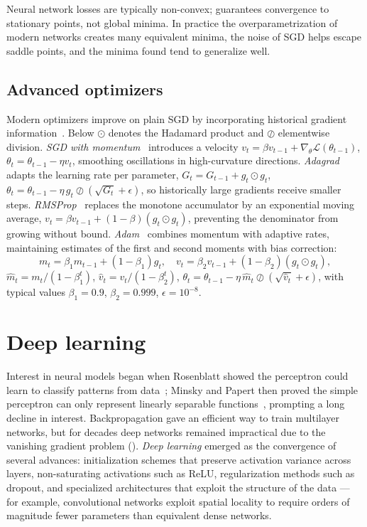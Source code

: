 Neural network losses are typically non-convex; 
guarantees convergence to stationary points, not global minima. In practice the
overparametrization of modern networks creates many equivalent minima, the noise
of SGD helps escape saddle points, and the minima found tend to generalize well.

\subsection{Advanced optimizers}
\label{sec:found:optimizers}

Modern optimizers improve on plain SGD by incorporating historical gradient
information~\citep{kingma2014adam,duchi2011adagrad}. Below $\odot$ denotes the
Hadamard product and $\oslash$ elementwise division. \emph{SGD with
momentum}~\citep{polyak1964methods} introduces a velocity
$v_t = \beta v_{t-1} + \nabla_\theta\mathcal{L}(\theta_{t-1})$,
$\theta_t = \theta_{t-1} - \eta v_t$, smoothing oscillations in high-curvature
directions. \emph{Adagrad}~\citep{duchi2011adagrad} adapts the learning rate per
parameter, $G_t = G_{t-1} + g_t \odot g_t$,
$\theta_t = \theta_{t-1} - \eta\, g_t \oslash (\sqrt{G_t} + \epsilon)$, so
historically large gradients receive smaller steps.
\emph{RMSProp}~\citep{hinton2012rmsprop} replaces the monotone accumulator by an
exponential moving average, $v_t = \beta v_{t-1} + (1-\beta)(g_t \odot g_t)$,
preventing the denominator from growing without bound. \emph{Adam}~\citep{kingma2014adam}
combines momentum with adaptive rates, maintaining estimates of the first and
second moments with bias correction:
\[
  m_t = \beta_1 m_{t-1} + (1-\beta_1)g_t, \quad
  v_t = \beta_2 v_{t-1} + (1-\beta_2)(g_t \odot g_t),
\]
$\hat m_t = m_t/(1-\beta_1^t)$, $\hat v_t = v_t/(1-\beta_2^t)$,
$\theta_t = \theta_{t-1} - \eta\, \hat m_t \oslash (\sqrt{\hat v_t} + \epsilon)$,
with typical values $\beta_1 = 0.9$, $\beta_2 = 0.999$, $\epsilon = 10^{-8}$.

\section{Deep learning}
\label{sec:found:deep}

Interest in neural models began when Rosenblatt showed the perceptron could learn
to classify patterns from data~\citep{rosenblatt1958perceptron}; Minsky and
Papert then proved the simple perceptron can only represent linearly separable
functions~\citep{minsky1969perceptrons}, prompting a long decline in interest.
Backpropagation gave an efficient way to train multilayer networks, but for
decades deep networks remained impractical due to the vanishing gradient problem
(). \emph{Deep learning} emerged as the convergence of
several advances: initialization schemes that preserve activation variance across
layers, non-saturating activations such as ReLU, regularization methods such as
dropout, and specialized architectures that exploit the structure of the data ---
for example, convolutional networks exploit spatial locality to require orders of
magnitude fewer parameters than equivalent dense networks.

